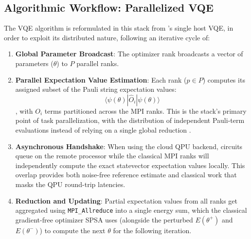 



\subsection{Algorithmic Workflow: Parallelized VQE}
The VQE algorithm is reformulated in this stack from \textcite{peruzzo2014variational}'s single host VQE, in order to exploit its distributed nature, 
following an iterative cycle of: 
    \begin{enumerate}
        \item \textbf{Global Parameter Broadcast}: The optimizer rank broadcasts a vector of parameters ($\theta$) to $P$ parallel ranks.
        \item \textbf{Parallel Expectation Value Estimation}: Each rank ($p \in P$) computes its assigned subset of the Pauli string expectation values: $$\langle\psi(\theta)|\hat{O}_i|\psi(\theta)\rangle$$, with $O_i$ terms partitioned across the MPI ranks. This is the stack's primary point of task parallelization, with the distribution of independent Pauli-term evaluations instead of relying on a single global reduction \parencite{bayraktar2023cuquantum}.
        \item \textbf{Asynchronous Handshake}: When using the cloud QPU backend, circuits queue on the remote processor while the classical MPI ranks will independently compute the exact statevector expectation values locally. This overlap provides both noise-free reference estimate and classical work that masks the QPU round-trip latencies.
        \item \textbf{Reduction and Updating}: Partial expectation values from all ranks get aggregated using \texttt{MPI\_Allreduce} into a single energy sum, which the classical gradient-free optimizer SPSA \parencite{pellow2021classicoptimizers} uses (alongside the perturbed $E(\theta^+)$ and $E(\theta^-)$) to compute the next $\theta$ for the following iteration.
    \end{enumerate}


